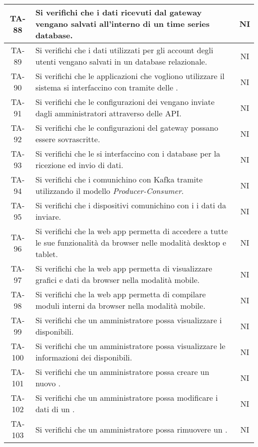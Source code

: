 \begin{center}
\begin{longtable}{|c|p{10cm}|c|}
			 \hline
			 TA-88 & Si verifichi che i dati ricevuti dal gateway vengano salvati all'interno di un time series database. & NI \\
			 \hline
			 TA-89 & Si verifichi che i dati utilizzati per gli account degli utenti vengano salvati in un database relazionale. & NI \\
			 \hline
			 TA-90 & Si verifichi che le applicazioni che vogliono utilizzare il sistema si interfaccino con \glock{Kafka} tramite delle \glock{API}. & NI \\
			 \hline
			 TA-91 & Si verifichi che le configurazioni dei \glock{gateway} vengano inviate dagli amministratori attraverso delle API. & NI \\
			 \hline
			 TA-92 & Si verifichi che le configurazioni del gateway possano essere sovrascritte. & NI \\
			 \hline
			 TA-93 & Si verifichi che le \glock{API} si interfaccino con i database per la ricezione ed invio di dati. & NI \\
			 \hline
			 TA-94 & Si verifichi che i \glock{gateway} comunichino con Kafka tramite \glock{topic} utilizzando il modello \textit{Producer-Consumer}. & NI \\
			 \hline
			 TA-95 & Si verifichi che i dispositivi comunichino con i \glock{gateway} i dati da inviare. & NI \\
			 \hline
			 TA-96 & Si verifichi che la web app permetta di accedere a tutte le sue funzionalità da browser nelle modalità desktop e tablet. & NI \\
			 \hline
			 TA-97 & Si verifichi che la web app permetta di visualizzare grafici e dati da browser nella modalità mobile. & NI \\
			 \hline
			 TA-98 & Si verifichi che la web app permetta di compilare moduli interni da browser nella modalità mobile. & NI \\
			 \hline
			 TA-99 & Si verifichi che un amministratore possa visualizzare i \glock{gateway} disponibili. & NI \\
			 \hline
			 TA-100 & Si verifichi che un amministratore possa visualizzare le informazioni dei \glock{gateway} disponibili. & NI \\
			 \hline
			 TA-101 & Si verifichi che un amministratore possa creare un nuovo \glock{gateway}. & NI \\
			 \hline
			 TA-102 & Si verifichi che un amministratore possa modificare i dati di un \glock{gateway}. & NI \\
			 \hline
			 TA-103 & Si verifichi che un amministratore possa rimuovere un \glock{gateway}. & NI \\

\end{longtable}
\end{center}

